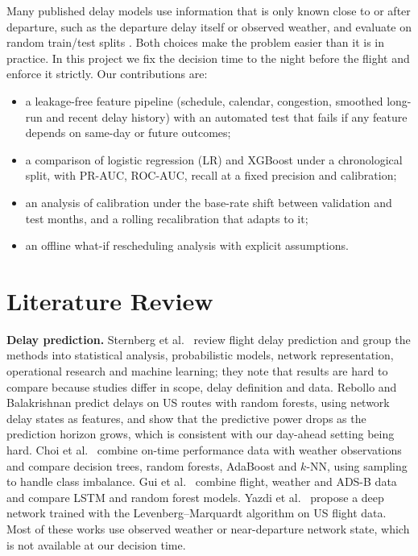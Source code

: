 \documentclass[conference]{IEEEtran}
\begin{document}
Many published delay models use information that is only known close to or after
departure, such as the departure delay itself or observed weather, and evaluate on
random train/test splits \cite{sternberg2017review}. Both choices make the problem
easier than it is in practice. In this project we fix the decision time to the night
before the flight and enforce it strictly. Our contributions are:
\begin{itemize}
\item a leakage-free feature pipeline (schedule, calendar, congestion, smoothed
  long-run and recent delay history) with an automated test that fails if any feature
  depends on same-day or future outcomes;
\item a comparison of logistic regression (LR) and XGBoost under a chronological
  split, with PR-AUC, ROC-AUC, recall at a fixed precision and calibration;
\item an analysis of calibration under the base-rate shift between validation and test
  months, and a rolling recalibration that adapts to it;
\item an offline what-if rescheduling analysis with explicit assumptions.
\end{itemize}

\section{Literature Review}
\textbf{Delay prediction.} Sternberg et al.\ \cite{sternberg2017review} review flight
delay prediction and group the methods into statistical analysis, probabilistic models, network
representation, operational research and machine learning; they note that results are hard to compare because
studies differ in scope, delay definition and data. Rebollo and Balakrishnan
\cite{rebollo2014} predict delays on US routes with random forests, using network
delay states as features, and show that the predictive power drops as the prediction
horizon grows, which is consistent with our day-ahead setting being hard.
Choi et al.\ \cite{choi2016} combine on-time performance data with weather
observations and compare decision trees, random forests, AdaBoost and $k$-NN,
using sampling to handle class imbalance. Gui et al.\ \cite{gui2020} combine
flight, weather and ADS-B data and compare LSTM and random forest models.
Yazdi et al.\ \cite{yazdi2020} propose a deep network trained with the
Levenberg--Marquardt algorithm on US flight data. Most of these works use observed
weather or near-departure network state, which is not available at our decision time.
\end{document}
